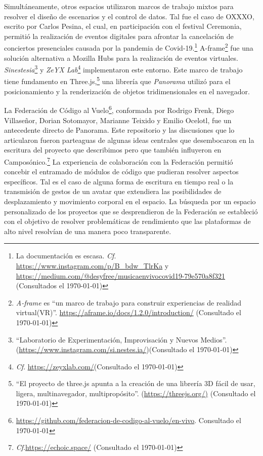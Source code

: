 Simultáneamente, otros espacios utilizaron marcos de trabajo mixtos para resolver el diseño de escenarios y el control de datos. Tal fue el caso de OXXXO, escrito por Carlos Pesina, el cual, en participación con el festival Ceremonia, permitió la realización de eventos digitales para afrontar la cancelación de conciertos presenciales causada por la pandemia de Covid-19.\footnote{La documentación es escasa. \emph{Cf}. \url{https://www.instagram.com/p/B_bdw_TlrKa}  y \url{https://medium.com/@desyfree/musicaenvivocovid19-79e570a8f321} (Consultados el \today)} A-frame\footnote{\emph{A-frame} es ``un marco de trabajo para construir experiencias de realidad virtual(VR)''. \url{https://aframe.io/docs/1.2.0/introduction/} (Consultado el \today)} fue una solución alternativa a Mozilla Hubs para la realización de eventos virtuales. \textit{Sinestesia}\footnote{``Laboratorio de Experimentación, Improvisación y Nuevos Medios''. (\url{https://www.instagram.com/si.nestes.ia/})(Consultado el \today)} y \textit{ZeYX Lab}\footnote{ \emph{Cf}. \url{https://zeyxlab.com/}(Consultado el \today)} implementaron este entorno. Este marco de trabajo tiene fundamento en Three.js,\footnote{``El proyecto de three.js apunta a la creación de una librería 3D fácil de usar, ligera, multinavegador, multipropósito''. (\url{https://threejs.org/)} (Consultado el \today)} una librería que \emph{Panorama} utilizó para el posicionamiento y la renderización de objetos tridimensionales en el navegador.

La Federación de Código al Vuelo\footnote{\url{https://github.com/federacion-de-codigo-al-vuelo/en-vivo}. Consultado el \today}, conformada por Rodrigo Frenk, Diego Villaseñor, Dorian Sotomayor, Marianne Teixido y Emilio Ocelotl, fue un antecedente directo de Panorama. Este repositorio y las discusiones que lo articularon fueron parteaguas de algunas ideas centrales que desembocaron en la escritura del proyecto que describimos pero que también influyeron en Camposónico.\footnote{\emph{Cf}.\url{https://echoic.space/} (Consultado el \today)} La experiencia de colaboración con la Federación permitió concebir el entramado de módulos de código que pudieran resolver aspectos específicos. Tal es el caso de alguna forma de escritura en tiempo real o la transmisión de gestos de un avatar que extendiera las posibilidades de desplazamiento y movimiento corporal en el espacio. La búsqueda por un espacio personalizado de los proyectos que se desprendieron de la Federación se estableció con el objetivo de resolver problemáticas de rendimiento que las plataformas de alto nivel resolvían de una manera poco transparente. 

